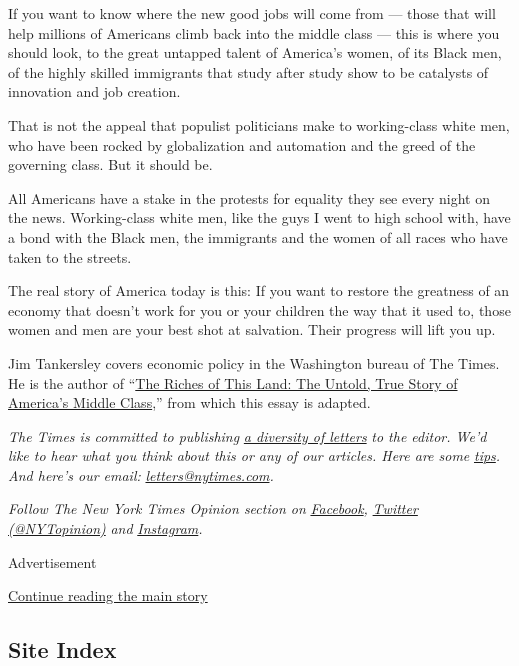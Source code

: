 If you want to know where the new good jobs will come from --- those
that will help millions of Americans climb back into the middle class
--- this is where you should look, to the great untapped talent of
America's women, of its Black men, of the highly skilled immigrants that
study after study show to be catalysts of innovation and job creation.

That is not the appeal that populist politicians make to working-class
white men, who have been rocked by globalization and automation and the
greed of the governing class. But it should be.

All Americans have a stake in the protests for equality they see every
night on the news. Working-class white men, like the guys I went to high
school with, have a bond with the Black men, the immigrants and the
women of all races who have taken to the streets.

The real story of America today is this: If you want to restore the
greatness of an economy that doesn't work for you or your children the
way that it used to, those women and men are your best shot at
salvation. Their progress will lift you up.

Jim Tankersley covers economic policy in the Washington bureau of The
Times. He is the author of
``\href{https://www.publicaffairsbooks.com/titles/jim-tankersley/the-riches-of-this-land/9781541767836/}{The
Riches of This Land: The Untold, True Story of America's Middle
Class},'' from which this essay is adapted.

\emph{The Times is committed to publishing}
\href{https://www.nytimes.com/2019/01/31/opinion/letters/letters-to-editor-new-york-times-women.html}{\emph{a
diversity of letters}} \emph{to the editor. We'd like to hear what you
think about this or any of our articles. Here are some}
\href{https://help.nytimes.com/hc/en-us/articles/115014925288-How-to-submit-a-letter-to-the-editor}{\emph{tips}}\emph{.
And here's our email:}
\href{mailto:letters@nytimes.com}{\emph{letters@nytimes.com}}\emph{.}

\emph{Follow The New York Times Opinion section on}
\href{https://www.facebook.com/nytopinion}{\emph{Facebook}}\emph{,}
\href{http://twitter.com/NYTOpinion}{\emph{Twitter (@NYTopinion)}}
\emph{and}
\href{https://www.instagram.com/nytopinion/}{\emph{Instagram}}\emph{.}

Advertisement

\protect\hyperlink{after-bottom}{Continue reading the main story}

\hypertarget{site-index}{%
\subsection{Site Index}\label{site-index}}

